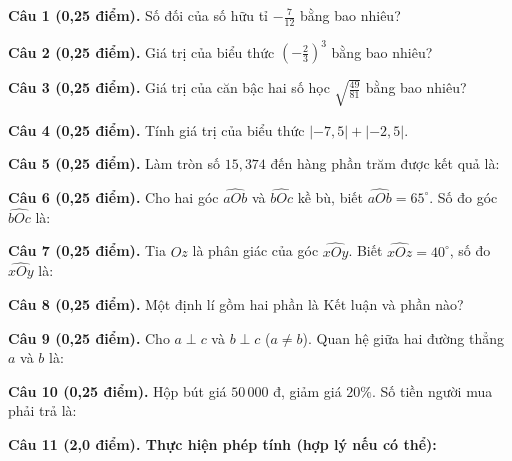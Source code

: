 \documentclass[12pt,a4paper]{article}
\begin{document}
\noindent\textbf{Câu 1 (0,25 điểm).} Số đối của số hữu tỉ $-\frac{7}{12}$ bằng bao nhiêu? \par\vspace{0.5mm}
\noindent\textbf{Câu 2 (0,25 điểm).} Giá trị của biểu thức $\left(-\frac{2}{3}\right)^3$ bằng bao nhiêu? \par\vspace{0.5mm}
\noindent\textbf{Câu 3 (0,25 điểm).} Giá trị của căn bậc hai số học $\sqrt{\frac{49}{81}}$ bằng bao nhiêu? \par\vspace{0.5mm}
\noindent\textbf{Câu 4 (0,25 điểm).} Tính giá trị của biểu thức $\lvert -7{,}5\rvert + \lvert -2{,}5\rvert$. \par\vspace{0.5mm}
\noindent\textbf{Câu 5 (0,25 điểm).} Làm tròn số $15{,}374$ đến hàng phần trăm được kết quả là: \par\vspace{0.5mm}
\noindent\textbf{Câu 6 (0,25 điểm).} Cho hai góc $\widehat{aOb}$ và $\widehat{bOc}$ kề bù, biết $\widehat{aOb}=65^\circ$. Số đo góc $\widehat{bOc}$ là: \par\vspace{0.5mm}
\noindent\textbf{Câu 7 (0,25 điểm).} Tia $Oz$ là phân giác của góc $\widehat{xOy}$. Biết $\widehat{xOz}=40^\circ$, số đo $\widehat{xOy}$ là: \par\vspace{0.5mm}
\noindent\textbf{Câu 8 (0,25 điểm).} Một định lí gồm hai phần là Kết luận và phần nào? \par\vspace{0.5mm}
\noindent\textbf{Câu 9 (0,25 điểm).} Cho $a \perp c$ và $b \perp c$ ($a \ne b$). Quan hệ giữa hai đường thẳng $a$ và $b$ là: \par\vspace{0.5mm}
\noindent\textbf{Câu 10 (0,25 điểm).} Hộp bút giá $50\,000$ đ, giảm giá $20\%$. Số tiền người mua phải trả là: \par\vspace{0.5mm}
\vspace{0.6mm}

\noindent\textbf{Câu 11 (2,0 điểm). Thực hiện phép tính (hợp lý nếu có thể):}
\vspace{0.8mm}
\end{document}
